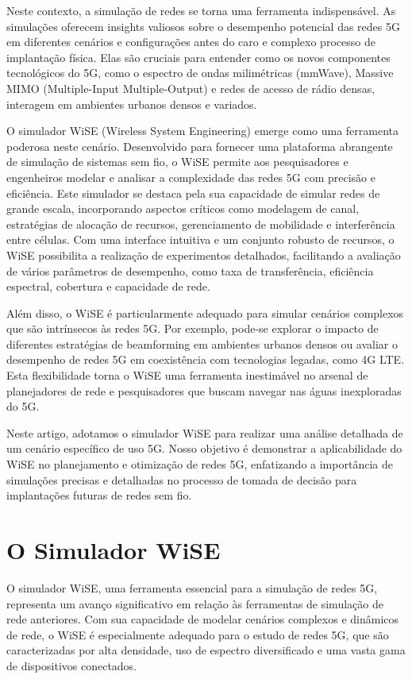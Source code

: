 \documentclass[journal]{IEEEtran}
\begin{document}
Neste contexto, a simulação de redes se torna uma ferramenta indispensável. As simulações oferecem insights valiosos sobre o desempenho potencial das redes 5G em diferentes cenários e configurações antes do caro e complexo processo de implantação física. Elas são cruciais para entender como os novos componentes tecnológicos do 5G, como o espectro de ondas milimétricas (mmWave), Massive MIMO (Multiple-Input Multiple-Output) e redes de acesso de rádio densas, interagem em ambientes urbanos densos e variados.


O simulador WiSE (Wireless System Engineering) emerge como uma ferramenta poderosa neste cenário. Desenvolvido para fornecer uma plataforma abrangente de simulação de sistemas sem fio, o WiSE permite aos pesquisadores e engenheiros modelar e analisar a complexidade das redes 5G com precisão e eficiência. Este simulador se destaca pela sua capacidade de simular redes de grande escala, incorporando aspectos críticos como modelagem de canal, estratégias de alocação de recursos, gerenciamento de mobilidade e interferência entre células. Com uma interface intuitiva e um conjunto robusto de recursos, o WiSE possibilita a realização de experimentos detalhados, facilitando a avaliação de vários parâmetros de desempenho, como taxa de transferência, eficiência espectral, cobertura e capacidade de rede.

Além disso, o WiSE é particularmente adequado para simular cenários complexos que são intrínsecos às redes 5G. Por exemplo, pode-se explorar o impacto de diferentes estratégias de beamforming em ambientes urbanos densos ou avaliar o desempenho de redes 5G em coexistência com tecnologias legadas, como 4G LTE. Esta flexibilidade torna o WiSE uma ferramenta inestimável no arsenal de planejadores de rede e pesquisadores que buscam navegar nas águas inexploradas do 5G.

Neste artigo, adotamos o simulador WiSE para realizar uma análise detalhada de um cenário específico de uso 5G. Nosso objetivo é demonstrar a aplicabilidade do WiSE no planejamento e otimização de redes 5G, enfatizando a importância de simulações precisas e detalhadas no processo de tomada de decisão para implantações futuras de redes sem fio.

\section{O Simulador WiSE}

O simulador WiSE, uma ferramenta essencial para a simulação de redes 5G, representa um avanço significativo em relação às ferramentas de simulação de rede anteriores. Com sua capacidade de modelar cenários complexos e dinâmicos de rede, o WiSE é especialmente adequado para o estudo de redes 5G, que são caracterizadas por alta densidade, uso de espectro diversificado e uma vasta gama de dispositivos conectados.
\end{document}
